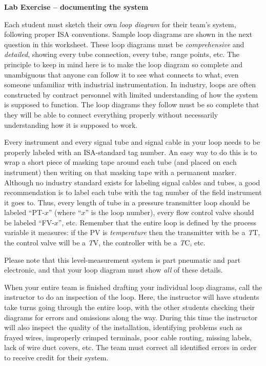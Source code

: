 \vfil \eject

\noindent
{\bf Lab Exercise -- documenting the system}

\vskip 5pt

Each student must sketch their own {\it loop diagram} for their team's system, following proper ISA conventions.  Sample loop diagrams are shown in the next question in this worksheet.  These loop diagrams must be {\it comprehensive} and {\it detailed}, showing every tube connection, every tube, range points, etc.  The principle to keep in mind here is to make the loop diagram so complete and unambiguous that anyone can follow it to see what connects to what, even someone unfamiliar with industrial instrumentation.  In industry, loops are often constructed by contract personnel with limited understanding of how the system is supposed to function.  The loop diagrams they follow must be so complete that they will be able to connect everything properly without necessarily understanding how it is supposed to work.

Every instrument and every signal tube and signal cable in your loop needs to be properly labeled with an ISA-standard tag number.  An easy way to do this is to wrap a short piece of masking tape around each tube (and placed on each instrument) then writing on that masking tape with a permanent marker.  Although no industry standard exists for labeling signal cables and tubes, a good recommendation is to label each tube with the tag number of the field instrument it goes to.  Thus, every length of tube in a pressure transmitter loop should be labeled ``PT-$x$'' (where ``$x$'' is the loop number), every flow control valve should be labeled ``FV-$x$'', etc.  Remember that the entire loop is defined by the process variable it measures: if the PV is {\it temperature} then the transmitter with be a {\it T}T, the control valve will be a {\it T}V, the controller with be a {\it T}C, etc.

Please note that this level-measurement system is part pneumatic and part electronic, and that your loop diagram must show {\it all} of these details.

When your entire team is finished drafting your individual loop diagrams, call the instructor to do an inspection of the loop.  Here, the instructor will have students take turns going through the entire loop, with the other students checking their diagrams for errors and omissions along the way.  During this time the instructor will also inspect the quality of the installation, identifying problems such as frayed wires, improperly crimped terminals, poor cable routing, missing labels, lack of wire duct covers, etc.  The team must correct all identified errors in order to receive credit for their system.  

